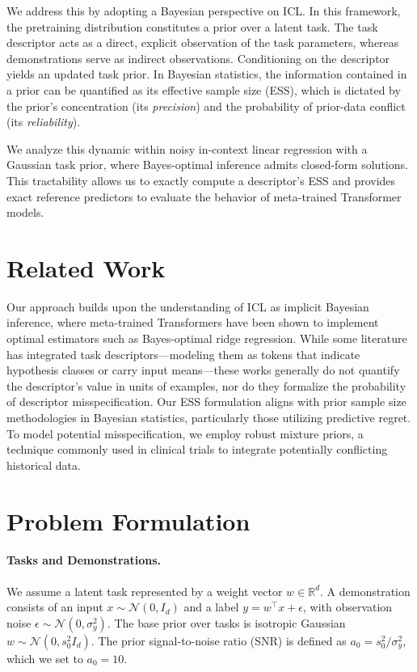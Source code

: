 \documentclass{article}
\begin{document}
We address this by adopting a Bayesian perspective on ICL. In this framework, the pretraining distribution constitutes a prior over a latent task. The task descriptor acts as a direct, explicit observation of the task parameters, whereas demonstrations serve as indirect observations. Conditioning on the descriptor yields an updated task prior. In Bayesian statistics, the information contained in a prior can be quantified as its effective sample size (ESS), which is dictated by the prior's concentration (its \emph{precision}) and the probability of prior-data conflict (its \emph{reliability}).

We analyze this dynamic within noisy in-context linear regression with a Gaussian task prior, where Bayes-optimal inference admits closed-form solutions. This tractability allows us to exactly compute a descriptor's ESS and provides exact reference predictors to evaluate the behavior of meta-trained Transformer models.

\section{Related Work}
Our approach builds upon the understanding of ICL as implicit Bayesian inference, where meta-trained Transformers have been shown to implement optimal estimators such as Bayes-optimal ridge regression. While some literature has integrated task descriptors---modeling them as tokens that indicate hypothesis classes or carry input means---these works generally do not quantify the descriptor's value in units of examples, nor do they formalize the probability of descriptor misspecification. Our ESS formulation aligns with prior sample size methodologies in Bayesian statistics, particularly those utilizing predictive regret. To model potential misspecification, we employ robust mixture priors, a technique commonly used in clinical trials to integrate potentially conflicting historical data.

\section{Problem Formulation}

\paragraph{Tasks and Demonstrations.} We assume a latent task represented by a weight vector $w \in \mathbb{R}^d$. A demonstration consists of an input $x \sim \mathcal{N}(0, I_d)$ and a label $y = w^\top x + \epsilon$, with observation noise $\epsilon \sim \mathcal{N}(0, \sigma_y^2)$. The base prior over tasks is isotropic Gaussian $w \sim \mathcal{N}(0, s_0^2 I_d)$. The prior signal-to-noise ratio (SNR) is defined as $a_0 = s_0^2/\sigma_y^2$, which we set to $a_0 = 10$.
\end{document}
